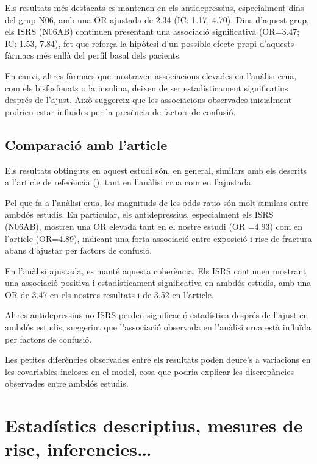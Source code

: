 \documentclass[
]{article}
\begin{document}
Els resultats més destacats es mantenen en els antidepressius,
especialment dins del grup N06, amb una OR ajustada de 2.34 (IC: 1.17,
4.70). Dins d'aquest grup, els ISRS (N06AB) continuen presentant una
associació significativa (OR=3.47; IC: 1.53, 7.84), fet que reforça la
hipòtesi d'un possible efecte propi d'aquests fàrmacs més enllà del
perfil basal dels pacients.

En canvi, altres fàrmacs que mostraven associacions elevades en
l'anàlisi crua, com els bisfosfonats o la insulina, deixen de ser
estadísticament significatius després de l'ajust. Això suggereix que les
associacions observades inicialment podrien estar influïdes per la
presència de factors de confusió.

\subsection{Comparació amb l'article}\label{comparaciuxf3-amb-larticle}

Els resultats obtinguts en aquest estudi són, en general, similars amb
els descrits a l'article de referència (), tant en l'anàlisi crua com en l'ajustada.

Pel que fa a l'anàlisi crua, les magnituds de les odds ratio són molt
similars entre ambdós estudis. En particular, els antidepressius,
especialment els ISRS (N06AB), mostren una OR elevada tant en el nostre
estudi (OR =4.93) com en l'article (OR=4.89), indicant una forta
associació entre exposició i risc de fractura abans d'ajustar per
factors de confusió.

En l'anàlisi ajustada, es manté aquesta coherència. Els ISRS continuen
mostrant una associació positiva i estadísticament significativa en
ambdós estudis, amb una OR de 3.47 en els nostres resultats i de 3.52 en
l'article.

Altres antidepressius no ISRS perden significació estadística després de
l'ajust en ambdós estudis, suggerint que l'associació observada en
l'anàlisi crua està influïda per factors de confusió.

Les petites diferències observades entre els resultats poden deure's a
variacions en les covariables incloses en el model, cosa que podria
explicar les discrepàncies observades entre ambdós estudis.

\clearpage

\section{Estadístics descriptius, mesures de risc,
inferencies\ldots{}}\label{estaduxedstics-descriptius-mesures-de-risc-inferencies}
\end{document}
